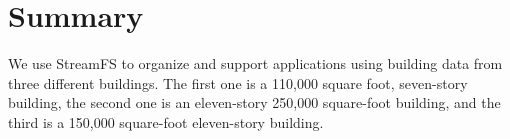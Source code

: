 \section{Summary}

We use StreamFS to organize and support applications using building data from three different
buildings.  The first one is a 110,000 square foot, seven-story building, the second one is an eleven-story
250,000 square-foot building, and the third is a 150,000 square-foot eleven-story building.
